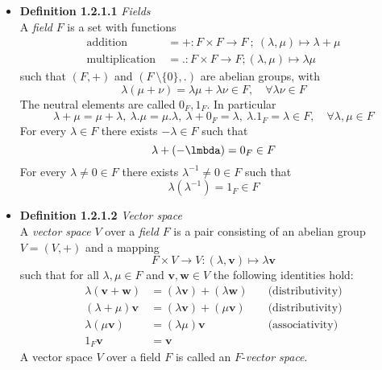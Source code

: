 \documentclass[11pt,a4paper]{article}
\begin{document}
\begin{itemize}

    \item \textbf{Definition 1.2.1.1} \emph{Fields} \\
        A \emph{field} $F$ is a set with functions
        \begin{align*}{}
            \text{addition} \  &= + : F \times F \to F \ ;
            \ (\lambda, \mu) \mapsto \lambda + \mu \\
            \text{multiplication} \ &=. : F \times F \to F ; (\lambda, \mu) \mapsto \lambda\mu
        \end{align*}
        such that $(F, +)$ and $(F \ \setminus \{0\},.)$ are abelian groups, with
        \[
            \lambda (\mu + \nu) = \lambda \mu + \lambda \nu \in F, \quad
            \forall \lambda \nu \in F
        \]
        The neutral elements are called $0_F, 1_F$.
        In particular
        \[
            \lambda + \mu = \mu + \lambda ,\
            \lambda. \mu  = \mu. \lambda ,\
            \lambda + 0_F = \lambda ,\
            \lambda. 1_F  = \lambda \in F, \quad
            \forall \lambda, \mu \in F
        \]
        For every $\lambda \in F$ there exists $-\lambda \in F$ such that
        \[
            \lambda + (-\lmbda) = 0_F \in F
        \]
        For every $\lambda \neq 0 \in F$ there exists $\lambda^{-1} \neq 0 \in F$ such that
        \[
            \lambda(\lambda^{-1}) = 1_F \in F
        \]

    \item \textbf{Definition 1.2.1.2} \emph{Vector space} \\
        A \emph{vector space} $V$ over a \emph{field} $F$
        is a pair consisting of an abelian group $V = (V,+)$ and a mapping
        \[
            F \times V \to V : (\lambda, \mathbf{v}) \mapsto \lambda \mathbf{v}
        \]
        such that for all $\lambda, \mu \in F$ and $\mathbf{v}, \mathbf{w} \in V$
        the following identities hold:
        \begin{align*}{}
            \lambda(\mathbf{v} + \mathbf{w}) & = (\lambda \mathbf{v}) + (\lambda \mathbf{w})
            \quad                            & \text{(distributivity)} \\
            (\lambda + \mu) \mathbf{v}       & = (\lambda \mathbf{v}) + (\mu \mathbf{v})
            \quad                            & \text{(distributivity)} \\
            \lambda(\mu \mathbf{v})          & = (\lambda \mu) \mathbf{v}
            \quad                            & \text{(associativity)} \\
            1_F\mathbf{v}                    & = \mathbf{v}
        \end{align*}
        A vector space $V$ over a field $F$ is called an $F$-\emph{vector space}.


\end{itemize}
\end{document}

